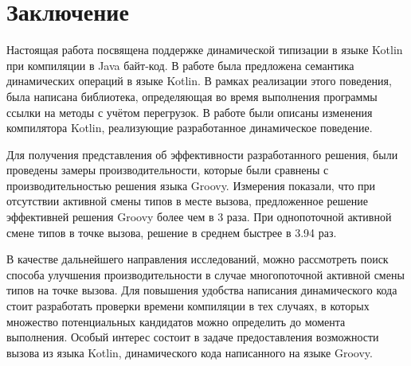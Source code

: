\vfill
\clearpage
\section*{Заключение}


Настоящая работа посвящена поддержке динамической типизации в языке Kotlin при компиляции в Java байт-код.
В работе была предложена семантика динамических операций в языке Kotlin. В рамках реализации этого поведения, была написана библиотека, определяющая во время выполнения программы ссылки на методы с учётом перегрузок. В работе были описаны изменения компилятора Kotlin, реализующие разработанное динамическое поведение. 

Для получения представления об эффективности разработанного решения, были проведены замеры производительности, которые были сравнены с производительностью решения языка Groovy.
Измерения показали, что при отсутствии активной смены типов в месте вызова, предложенное решение эффективней решения Groovy более чем в 3 раза. При однопоточной активной смене типов в точке вызова, решение в среднем быстрее в 3.94 раз. %


В качестве дальнейшего направления исследований, можно рассмотреть поиск способа улучшения производительности в случае многопоточной активной смены типов на точке вызова.
Для повышения удобства написания динамического кода стоит разработать проверки времени компиляции в тех случаях, в которых множество потенциальных кандидатов можно определить до момента выполнения. Особый интерес состоит в задаче предоставления возможности вызова из языка Kotlin, динамического кода написанного на языке Groovy.

